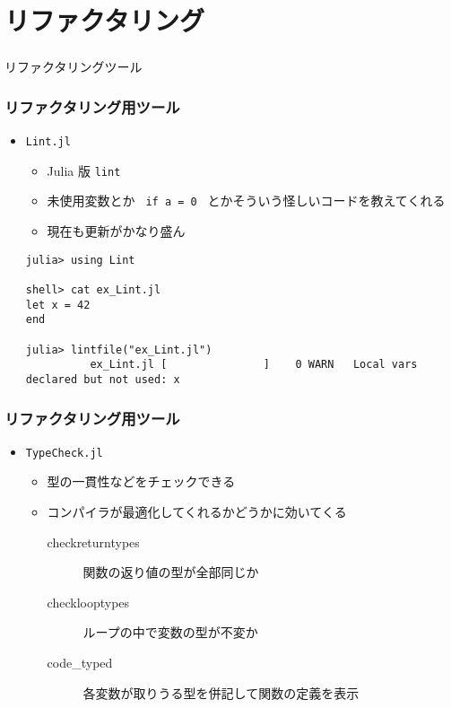\section{リファクタリング}

\begin{frame}
  \frametitle{}
  {\Huge リファクタリングツール}
\end{frame}

\begin{frame}[containsverbatim]
\frametitle{リファクタリング用ツール}
\begin{itemize}
  \item \verb|Lint.jl|
    \begin{itemize}
      \item Julia 版 \verb|lint|
      \item 未使用変数とか \verb| if a = 0 | とかそういう怪しいコードを教えてくれる
      \item 現在も更新がかなり盛ん
    \end{itemize}
    \begin{lstlisting}
julia> using Lint

shell> cat ex_Lint.jl
let x = 42
end

julia> lintfile("ex_Lint.jl")
          ex_Lint.jl [               ]    0 WARN   Local vars declared but not used: x
    \end{lstlisting}
\end{itemize}
\end{frame}

\begin{frame}[containsverbatim]
\frametitle{リファクタリング用ツール}
\begin{itemize}
  \item \verb|TypeCheck.jl|
    \begin{itemize}
      \item 型の一貫性などをチェックできる
      \item コンパイラが最適化してくれるかどうかに効いてくる
        \begin{description}
          \item[checkreturntypes] 関数の返り値の型が全部同じか
          \item[checklooptypes] ループの中で変数の型が不変か
          \item[code\_typed] 各変数が取りうる型を併記して関数の定義を表示
        \end{description}
    \end{itemize}
\end{itemize}
\end{frame}

